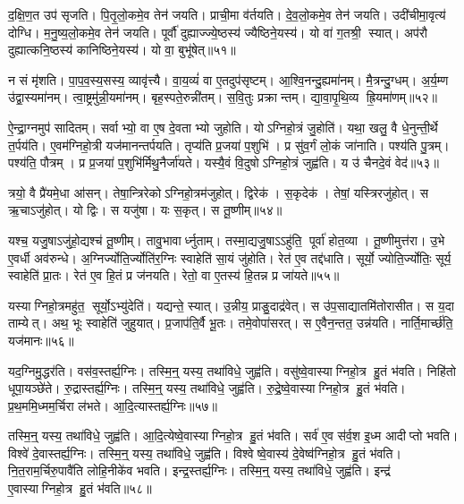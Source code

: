 द॒क्षि॒ण॒त उप॑ सृजति।
पि॒तृ॒लो॒कमे॒व तेन॑ जयति।
प्राची॒मा व॑र्तयति।
दे॒व॒लो॒कमे॒व तेन॑ जयति।
उदी॑चीमा॒वृत्य॑ दोग्धि।
म॒नु॒ष्य॒लो॒कमे॒व तेन॑ जयति।
पूर्वौ॑ दुह्याज्ज्ये॒ष्ठस्य॑ ज्यैष्ठिने॒यस्य॑।
यो वा॑ ग॒तश्री॒ स्यात्।
अप॑रौ दुह्यात्कनि॒ष्ठस्य॑ कानिष्ठिने॒यस्य॑।
यो वा॒ बुभू॑षेत्॥५१॥

न सं मृ॑शति।
पा॒प॒व॒स्य॒सस्य॒ व्यावृ॑त्त्यै।
वा॒य॒व्यं॑ वा ए॒तदुप॑सृष्टम्।
आ॒श्वि॒नन्दु॒ह्यमा॑नम्।
मै॒त्रन्दु॒ग्धम्।
अ॒र्य॒म्ण उ॑द्वा॒स्यमा॑नम्।
त्वा॒ष्ट्रमु॑न्नी॒यमा॑नम्।
बृह॒स्पते॒रुन्नी॑तम्।
स॒वि॒तुः प्रक्रान्तम्।
द्या॒वा॒पृ॒थि॒व्य ह्रि॒यमा॑णम्॥५२॥

ऐ॒न्द्रा॒ग्नमुप॑ सादितम्।
सर्वाभ्यो॒ वा ए॒ष दे॒वताभ्यो जुहोति।
योऽग्निहो॒त्रं जु॒होति॑।
यथा॒ खलु॒ वै धे॒नुन्ती॒र्थे त॒र्पय॑ति।
ए॒वम॑ग्निहो॒त्री यज॑मानन्तर्पयति।
तृप्य॑ति प्र॒जया॑ प॒शुभि॑।
प्र सु॑व॒र्गं लो॒कं जा॑नाति।
पश्य॑ति पु॒त्रम्।
पश्य॑ति॒ पौत्रम्।
प्र प्र॒जया॑ प॒शुभि॑र्मिथु॒नैर्जा॑यते।
यस्यै॒वं वि॒दुषोऽग्निहो॒त्रं जुह्व॑ति।
य उ॑ चैनदे॒वं वेद॑॥५३॥\anuvakamend[बुभू॑षेद्ध्रि॒यमा॑णञ्जायते॒ द्वे च॑]

त्रयो॒ वै प्रै॑यमे॒धा आ॑सन्।
तेषा॒न्त्रिरेकोऽग्निहो॒त्रम॑जुहोत्।
द्विरेक॑।
स॒कृदेक॑।
तेषां॒ यस्त्रिरजु॑होत्।
स ऋ॒चाऽजु॑होत्।
यो द्विः।
स यजु॑षा।
यः स॒कृत्।
स तू॒ष्णीम्॥५४॥

यश्च॒ यजु॒षाऽजु॑हो॒द्यश्च॑ तू॒ष्णीम्।
तावु॒भावार्ध्नुताम्।
तस्मा॒द्यजु॒षाऽऽहु॑ति॒ पूर्वा॑ होत॒व्या।
तू॒ष्णीमुत्त॑रा।
उ॒भे ए॒वर्धी अव॑रुन्धे।
अ॒ग्निर्ज्योति॒र्ज्योति॑र॒ग्निः स्वाहेति॑ सा॒यं जु॑होति।
रेत॑ ए॒व तद्द॑धाति।
सूर्यो॒ ज्योति॒र्ज्योतिः॒ सूर्य॒ स्वाहेति॑ प्रा॒तः।
रेत॑ ए॒व हि॒तं प्र ज॑नयति।
रेतो॒ वा ए॒तस्य॑ हि॒तन्न प्र जा॑यते॥५५॥

यस्याग्निहो॒त्रमहु॑त॒ सूर्यो॒ऽभ्यु॑देति॑।
यद्यन्ते॒ स्यात्।
उ॒न्नीय॒ प्राङु॒दाद्र॑वेत्।
स उ॑प॒साद्यातमि॑तोरासीत।
स य॒दा ताम्येत्।
अथ॒ भूः स्वाहेति॑ जुहुयात्।
प्र॒जाप॑ति॒र्वै भू॒तः।
तमे॒वोपा॑सरत्।
स ए॒वैन॒न्तत॒ उन्न॑यति।
नार्ति॒मार्च्छ॑ति॒ यज॑मानः॥५६॥\anuvakamend[तू॒ष्णीञ्जा॑यते॒ यज॑मानः]

यद॒ग्निमु॒द्धर॑ति।
वस॑व॒स्तर्ह्य॒ग्निः।
तस्मि॒न्॒ यस्य॒ तथा॑विधे॒ जुह्व॑ति।
वसु॑ष्वे॒वास्याग्निहो॒त्र हु॒तं भ॑वति।
निहि॑तो धूपा॒यञ्छे॑ते।
रु॒द्रास्तर्ह्य॒ग्निः।
तस्मि॒न्॒ यस्य॒ तथा॑विधे॒ जुह्व॑ति।
रु॒द्रे॒ष्वे॒वास्याग्निहो॒त्र हु॒तं भ॑वति।
प्र॒थ॒ममि॒ध्मम॒र्चिरा ल॑भते।
आ॒दि॒त्यास्तर्ह्य॒ग्निः॥५७॥

तस्मि॒न्॒ यस्य॒ तथा॑विधे॒ जुह्व॑ति।
आ॒दि॒त्येष्वे॒वास्याग्निहो॒त्र हु॒तं भ॑वति।
सर्व॑ ए॒व स॑र्व॒श इ॒ध्म आदीप्तो भवति।
विश्वे॑ दे॒वास्तर्ह्य॒ग्निः।
तस्मि॒न्॒ यस्य॒ तथा॑विधे॒ जुह्व॑ति।
विश्वेष्वे॒वास्य॑ दे॒वेष्व॑ग्निहो॒त्र हु॒तं भ॑वति।
नि॒त॒राम॒र्चिरु॒पावै॑ति लोहि॒नीके॑व भवति।
इन्द्र॒स्तर्ह्य॒ग्निः।
तस्मि॒न्॒ यस्य॒ तथा॑विधे॒ जुह्व॑ति।
इन्द्र॑ ए॒वास्याग्निहो॒त्र हु॒तं भ॑वति॥५८॥


